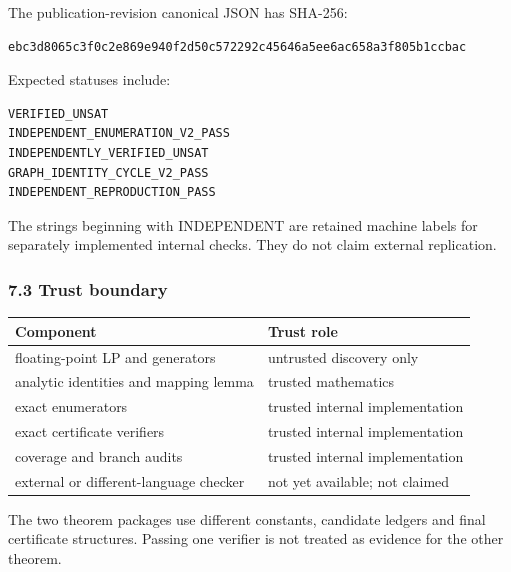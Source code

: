 \documentclass[
  english,
  11pt,
  a4paper,
]{article}
\newcounter{none} %
\begin{document}
The publication-revision canonical JSON has SHA-256:

\begin{verbatim}
ebc3d8065c3f0c2e869e940f2d50c572292c45646a5ee6ac658a3f805b1ccbac
\end{verbatim}

Expected statuses include:

\begin{verbatim}
VERIFIED_UNSAT
INDEPENDENT_ENUMERATION_V2_PASS
INDEPENDENTLY_VERIFIED_UNSAT
GRAPH_IDENTITY_CYCLE_V2_PASS
INDEPENDENT_REPRODUCTION_PASS
\end{verbatim}

The strings beginning with INDEPENDENT are retained machine labels for
separately implemented internal checks. They do not claim external
replication.

\subsubsection{7.3 Trust boundary}\label{trust-boundary}

{\def\LTcaptype{none} %
\begin{longtable}[]{@{}
  >{\raggedright\arraybackslash}p{}
  >{\raggedright\arraybackslash}p{}@{}}
\toprule\noalign{}
\begin{minipage}[b]{\linewidth}\raggedright
Component
\end{minipage} & \begin{minipage}[b]{\linewidth}\raggedright
Trust role
\end{minipage} \\
\midrule\noalign{}
\endhead
\bottomrule\noalign{}
\endlastfoot
floating-point LP and generators & untrusted discovery only \\
analytic identities and mapping lemma & trusted mathematics \\
exact enumerators & trusted internal implementation \\
exact certificate verifiers & trusted internal implementation \\
coverage and branch audits & trusted internal implementation \\
external or different-language checker & not yet available; not
claimed \\
\end{longtable}
}

The two theorem packages use different constants, candidate ledgers and
final certificate structures. Passing one verifier is not treated as
evidence for the other theorem.
\end{document}
